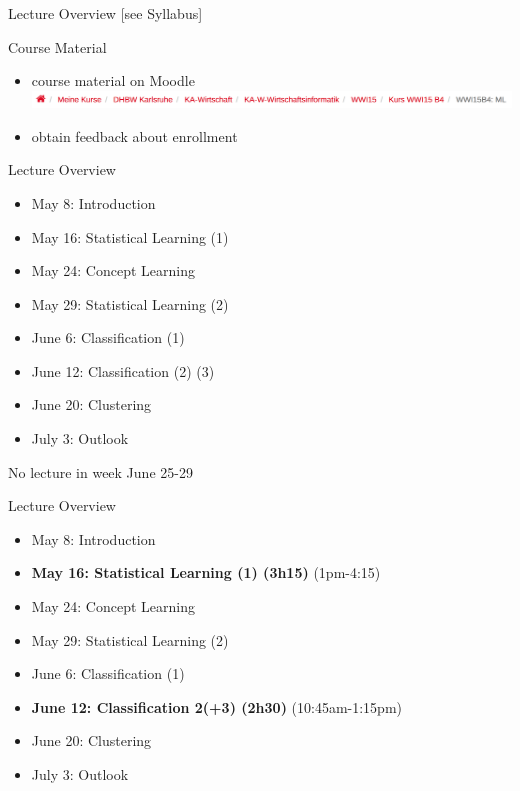 \documentclass{beamer}
\begin{document}
\begin{frame}{Lecture Overview}
[see Syllabus]
\end{frame}

\begin{frame}{Course Material}
\begin{itemize}
\item course material on Moodle\\
\includegraphics[width=1\textwidth]{moodle_path}
\item obtain feedback about enrollment
\end{itemize}

\end{frame}

\begin{frame}{Lecture Overview}
\begin{itemize}
\item May 8: \tabto{2cm} Introduction
\item May 16: \tabto{2cm} Statistical Learning (1)
\item May 24: \tabto{2cm} Concept Learning
\item May 29: \tabto{2cm} Statistical Learning (2)
\item June 6: \tabto{2cm} Classification (1)
\item June 12: \tabto{2cm} Classification (2) (3)
\item June 20: \tabto{2cm} Clustering
\item July 3: \tabto{2cm} Outlook
\end{itemize}
No lecture in week June 25-29
\end{frame}

\begin{frame}{Lecture Overview}
\begin{itemize}
\item May 8: \tabto{2cm} Introduction
\item \textbf{May 16: \tabto{2cm} Statistical Learning (1) (3h15)} (1pm-4:15)
\item May 24: \tabto{2cm} Concept Learning
\item May 29: \tabto{2cm} Statistical Learning (2)
\item June 6: \tabto{2cm} Classification (1)
\item \textbf{June 12: \tabto{2cm} Classification 2(+3) (2h30)} (10:45am-1:15pm)
\item June 20: \tabto{2cm} Clustering
\item July 3: \tabto{2cm} Outlook
\end{itemize}
\end{frame}
\end{document}
